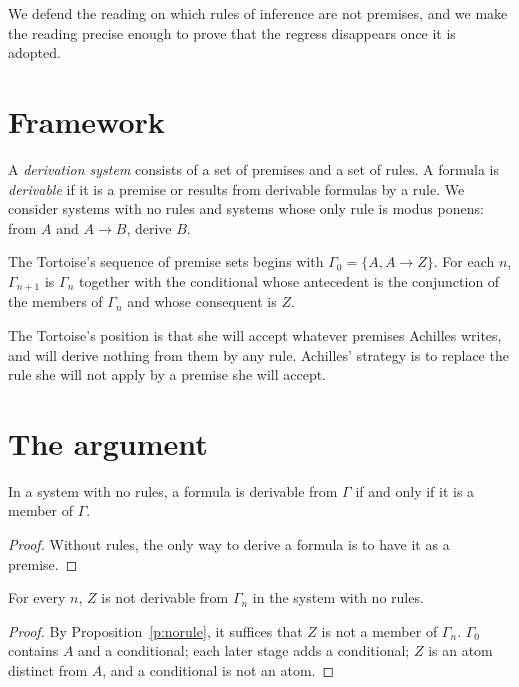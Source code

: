 \documentclass{situationist-preprint}
\begin{document}
We defend the reading on which rules of inference are not premises, and we make the reading precise enough to prove that the regress disappears once it is adopted.

\section{Framework}

\begin{definition}\label{d:deriv}
A \emph{derivation system} consists of a set of premises and a set of rules. A formula is \emph{derivable} if it is a premise or results from derivable formulas by a rule. We consider systems with no rules and systems whose only rule is modus ponens: from $A$ and $A \to B$, derive $B$.
\end{definition}

\begin{definition}\label{d:tort}
The Tortoise's sequence of premise sets begins with $\Gamma_0 = \{A, A \to Z\}$. For each $n$, $\Gamma_{n+1}$ is $\Gamma_n$ together with the conditional whose antecedent is the conjunction of the members of $\Gamma_n$ and whose consequent is $Z$.
\end{definition}

The Tortoise's position is that she will accept whatever premises Achilles writes, and will derive nothing from them by any rule. Achilles' strategy is to replace the rule she will not apply by a premise she will accept.

\section{The argument}

\begin{proposition}\label{p:norule}
In a system with no rules, a formula is derivable from $\Gamma$ if and only if it is a member of $\Gamma$.
\end{proposition}

\begin{proof}
Without rules, the only way to derive a formula is to have it as a premise.
\end{proof}

\begin{theorem}\label{t:regress}
For every $n$, $Z$ is not derivable from $\Gamma_n$ in the system with no rules.
\end{theorem}

\begin{proof}
By Proposition~\ref{p:norule}, it suffices that $Z$ is not a member of $\Gamma_n$. $\Gamma_0$ contains $A$ and a conditional; each later stage adds a conditional; $Z$ is an atom distinct from $A$, and a conditional is not an atom.
\end{proof}
\end{document}
